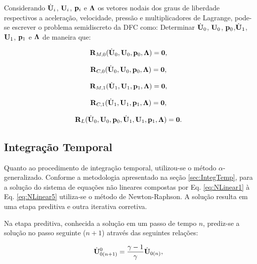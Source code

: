 \documentclass[tese_patricia]{subfiles}
\begin{document}
Considerando $\dot{\mathbf{U}}_{i}$, $\mathbf{U}_{i}$, $\mathbf{p}_i$ e $\boldsymbol{\Lambda}$ os vetores nodais dos graus de liberdade respectivos a aceleração, velocidade, pressão e multiplicadores de Lagrange, pode-se escrever o problema semidiscreto da DFC como: Determinar $\dot{\mathbf{U}}_0$, $\mathbf{U}_0$, $\mathbf{p}_0$,$\dot{\mathbf{U}}_1$, $\mathbf{U}_1$, $\mathbf{p}_1$ e $\boldsymbol{\Lambda}$ de maneira que:

\begin{align}
	\mathbf{R}_{M,0}(\dot{\mathbf{U}}_0,\mathbf{U}_0,\mathbf{p}_0,\boldsymbol{\Lambda}) = \mathbf{0}, \label{eq:NLinear1}
\end{align}

\begin{align}
	\mathbf{R}_{C,0}(\dot{\mathbf{U}}_0,\mathbf{U}_0,\mathbf{p}_0,\boldsymbol{\Lambda}) = \mathbf{0},
\end{align}

\begin{align}
	\mathbf{R}_{M,1}(\dot{\mathbf{U}}_1,\mathbf{U}_1,\mathbf{p}_1,\boldsymbol{\Lambda}) = \mathbf{0},
\end{align}

\begin{align}
	\mathbf{R}_{C,1}(\dot{\mathbf{U}}_1,\mathbf{U}_1,\mathbf{p}_1,\boldsymbol{\Lambda}) = \mathbf{0},
\end{align}

\begin{align}
	\mathbf{R}_{L}(\dot{\mathbf{U}}_0,\mathbf{U}_0,\mathbf{p}_0,\dot{\mathbf{U}}_1,\mathbf{U}_1,\mathbf{p}_1,\boldsymbol{\Lambda}) = \mathbf{0}. \label{eq:NLinear5}
\end{align}


\subsection{Integração Temporal}


Quanto ao procedimento de integração temporal, utilizou-se o método $\alpha$-generalizado. Conforme a metodologia apresentado na seção \ref{sec:IntegTemp}, para a solução do sistema de equações não lineares compostas por Eq. \eqref{eq:NLinear1} à Eq. \eqref{eq:NLinear5} utiliza-se o método de Newton-Raphson. A solução resulta em uma etapa preditiva e outra iterativa corretiva.

Na etapa preditiva, conhecida a solução em um passo de tempo $n$, prediz-se a solução no passo seguinte ($n+1$) através das seguintes relações:

\begin{align}
	\dot{\mathbf{U}}_{0(n+1)}^{0} = \frac{\gamma-1}{\gamma}\dot{\mathbf{U}}_{0(n)} \label{eq:PredArlq1},
\end{align}
\end{document}
